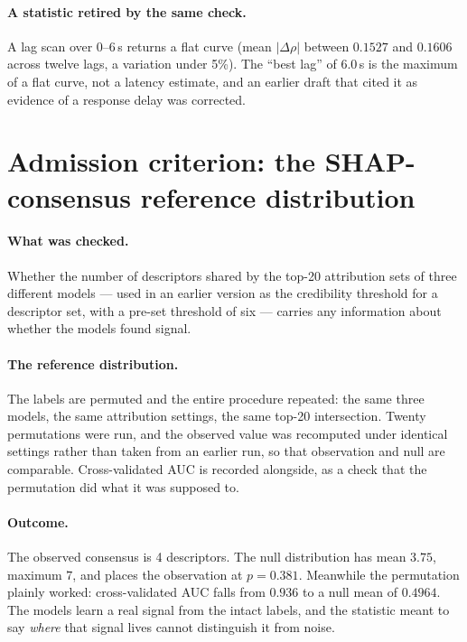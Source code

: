 \paragraph{A statistic retired by the same check.}
A lag scan over 0--6\,s returns a flat curve (mean $|\Delta\rho|$ between $0.1527$ and
$0.1606$ across twelve lags, a variation under 5\%). The ``best lag'' of $6.0$\,s is
the maximum of a flat curve, not a latency estimate, and an earlier draft that cited it
as evidence of a response delay was corrected.

\section{Admission criterion: the SHAP-consensus reference distribution}

\paragraph{What was checked.}
Whether the number of descriptors shared by the top-20 attribution sets of three
different models --- used in an earlier version as the credibility threshold for a
descriptor set, with a pre-set threshold of six --- carries any information about
whether the models found signal.

\paragraph{The reference distribution.}
The labels are permuted and the entire procedure repeated: the same three models, the
same attribution settings, the same top-20 intersection. Twenty permutations were run,
and the observed value was recomputed under identical settings rather than taken from
an earlier run, so that observation and null are comparable. Cross-validated AUC is
recorded alongside, as a check that the permutation did what it was supposed to.

\paragraph{Outcome.}
The observed consensus is 4 descriptors. The null distribution has mean $3.75$,
maximum $7$, and places the observation at $p = 0.381$. Meanwhile the permutation
plainly worked: cross-validated AUC falls from $0.936$ to a null mean of $0.4964$. The
models learn a real signal from the intact labels, and the statistic meant to say
\emph{where} that signal lives cannot distinguish it from noise.

